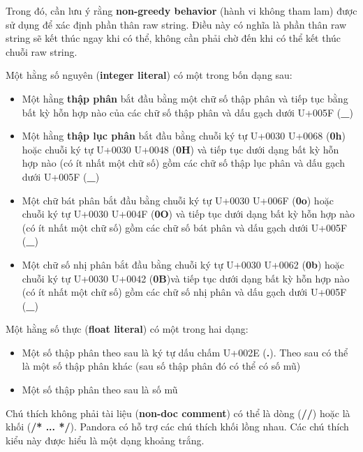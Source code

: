     \regexrawstringliteral

    Trong đó, cần lưu ý rằng \textbf{non-greedy behavior} (hành vi không tham lam) được sử dụng để xác định phần thân raw string. Điều này có nghĩa là phần thân raw string sẽ kết thúc ngay khi có thể, không cần phải chờ đến khi có thể kết thúc chuỗi raw string.

    Một hằng số nguyên (\textbf{integer literal}) có một trong bốn dạng sau:

    \begin{itemize}
        \item{Một hằng \textbf{thập phân} bắt đầu bằng một chữ số thập phân và tiếp tục bằng bất kỳ hỗn hợp nào của các chữ số thập phân và dấu gạch dưới U+005F (\textbf{\_})}
        \item{Một hằng \textbf{thập lục phân} bắt đầu bằng chuỗi ký tự U+0030 U+0068 (\textbf{0h}) hoặc chuỗi ký tự U+0030 U+0048 (\textbf{0H}) và tiếp tục dưới dạng bất kỳ hỗn hợp nào (có ít nhất một chữ số) gồm các chữ số thập lục phân và dấu gạch dưới U+005F (\textbf{\_})}
        \item{Một chữ bát phân bắt đầu bằng chuỗi ký tự U+0030 U+006F (\textbf{0o}) hoặc chuỗi ký tự U+0030 U+004F (\textbf{0O}) và tiếp tục dưới dạng bất kỳ hỗn hợp nào (có ít nhất một chữ số) gồm các chữ số bát phân và dấu gạch dưới U+005F (\textbf{\_})}
        \item{Một chữ số nhị phân bắt đầu bằng chuỗi ký tự U+0030 U+0062 (\textbf{0b}) hoặc chuỗi ký tự U+0030 U+0042 (\textbf{0B})và tiếp tục dưới dạng bất kỳ hỗn hợp nào (có ít nhất một chữ số) gồm các chữ số nhị phân và dấu gạch dưới U+005F (\textbf{\_})}
    \end{itemize}

    \regexintegerliteral

    Một hằng số thực (\textbf{float literal}) có một trong hai dạng:
    \begin{itemize}
        \item{Một số thập phân theo sau là ký tự dấu chấm U+002E (\textbf{.}). Theo sau có thể là một số thập phân khác (sau số thập phân đó có thể có số mũ)}
        \item{Một số thập phân theo sau là số mũ}
    \end{itemize}

    \regexfloatliteral

    Chú thích không phải tài liệu (\textbf{non-doc comment}) có thể là dòng (\textbf{//}) hoặc là khối (\textbf{/* ... */}). Pandora có hỗ trợ các chú thích khối lồng nhau. Các chú thích kiểu này được hiểu là một dạng khoảng trắng.

